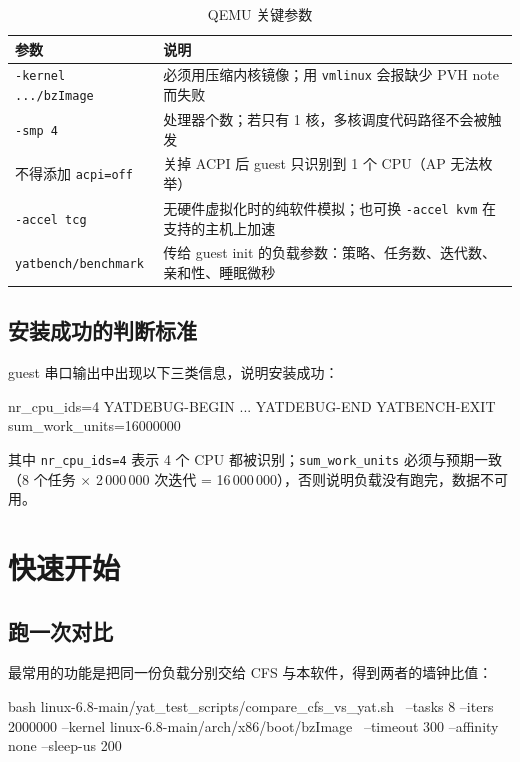 \documentclass[11pt,a4paper]{article}
\newcommand{\code}[1]{\texttt{#1}}
\newenvironment{shell}{\Verbatim[fontsize=\small,frame=single,framesep=4pt]}{\endVerbatim}
\begin{document}
\begin{table}[H]
\centering
\caption{QEMU 关键参数}
\label{tab:qemu}
\small
\begin{tabular}{@{}p{4.6cm}p{9.4cm}@{}}
\toprule
参数 & 说明 \\
\midrule
\code{-kernel .../bzImage} & 必须用压缩内核镜像；用 \code{vmlinux} 会报缺少 PVH note 而失败 \\
\code{-smp 4} & 处理器个数；若只有 1 核，多核调度代码路径不会被触发 \\
不得添加 \code{acpi=off} & 关掉 ACPI 后 guest 只识别到 1 个 CPU（AP 无法枚举） \\
\code{-accel tcg} & 无硬件虚拟化时的纯软件模拟；也可换 \code{-accel kvm} 在支持的主机上加速 \\
\code{yatbench/benchmark} & 传给 guest init 的负载参数：策略、任务数、迭代数、亲和性、睡眠微秒 \\
\bottomrule
\end{tabular}
\end{table}

\subsection{安装成功的判断标准}

guest 串口输出中出现以下三类信息，说明安装成功：

\begin{shell}
nr_cpu_ids=4
YATDEBUG-BEGIN ... YATDEBUG-END
YATBENCH-EXIT sum_work_units=16000000
\end{shell}

其中 \code{nr\_cpu\_ids=4} 表示 4 个 CPU 都被识别；\code{sum\_work\_units} 必须与预期一致
（8 个任务 $\times$ 2\,000\,000 次迭代 = 16\,000\,000），否则说明负载没有跑完，数据不可用。

\section{快速开始}

\subsection{跑一次对比}

最常用的功能是把同一份负载分别交给 CFS 与本软件，得到两者的墙钟比值：

\begin{shell}
bash linux-6.8-main/yat_test_scripts/compare_cfs_vs_yat.sh \
  --tasks 8 --iters 2000000 --kernel linux-6.8-main/arch/x86/boot/bzImage \
  --timeout 300 --affinity none --sleep-us 200
\end{shell}
\end{document}

